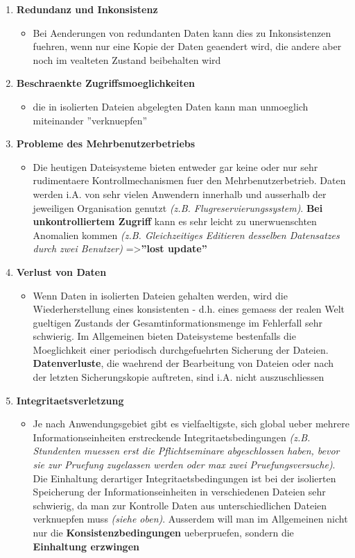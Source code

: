 \documentclass[a4paper,10pt]{article}
\begin{document}
\begin{enumerate}
\item \textbf{Redundanz und Inkonsistenz}
\begin{itemize}
\item Bei Aenderungen von redundanten Daten kann dies zu Inkonsistenzen fuehren, wenn nur eine Kopie der Daten geaendert wird, die andere aber noch im vealteten Zustand beibehalten wird
\end{itemize}
\item \textbf{Beschraenkte Zugriffsmoeglichkeiten}
\begin{itemize}
\item die in isolierten Dateien abgelegten Daten kann man unmoeglich miteinander ''verknuepfen''
\end{itemize}
\item \textbf{Probleme des Mehrbenutzerbetriebs}
\begin{itemize}
\item Die heutigen Dateisysteme bieten entweder gar keine oder nur sehr rudimentaere Kontrollmechanismen fuer den Mehrbenutzerbetrieb. Daten werden i.A. von sehr vielen Anwendern innerhalb und ausserhalb der jeweiligen Organisation genutzt \emph{(z.B. Flugreservierungssystem)}. \textbf{Bei unkontrolliertem Zugriff} kann es sehr leicht zu unerwuenschten Anomalien kommen \emph{(z.B. Gleichzeitiges Editieren desselben Datensatzes durch zwei Benutzer)} =\textgreater \textbf{''lost update''}
\end{itemize}
\item \textbf{Verlust von Daten}
\begin{itemize}
\item Wenn Daten in isolierten Dateien gehalten werden, wird die Wiederherstellung eines konsistenten - d.h. eines gemaess der realen Welt gueltigen Zustands der Gesamtinformationsmenge im Fehlerfall sehr schwierig. Im Allgemeinen bieten Dateisysteme bestenfalls die Moeglichkeit einer periodisch durchgefuehrten Sicherung der Dateien. \textbf{Datenverluste}, die waehrend der Bearbeitung von Dateien oder nach der letzten Sicherungskopie auftreten, sind i.A. nicht auszuschliessen
\end{itemize}
\item \textbf{Integritaetsverletzung}
\begin{itemize}
\item Je nach Anwendungsgebiet gibt es vielfaeltigste, sich global ueber mehrere Informationseinheiten erstreckende Integritaetsbedingungen \emph{(z.B. Stundenten muessen erst die Pflichtseminare abgeschlossen haben, bevor sie zur Pruefung zugelassen werden oder max zwei Pruefungsversuche)}. Die Einhaltung derartiger Integritaetsbedingungen ist bei der isolierten Speicherung der Informationseinheiten in verschiedenen Dateien sehr schwierig, da man zur Kontrolle Daten aus unterschiedlichen Dateien verknuepfen muss \emph{(siehe oben)}. Ausserdem will man im Allgemeinen nicht nur die \textbf{Konsistenzbedingungen} ueberpruefen, sondern die \textbf{Einhaltung erzwingen}

\end{itemize}
\end{enumerate}
\end{document}
